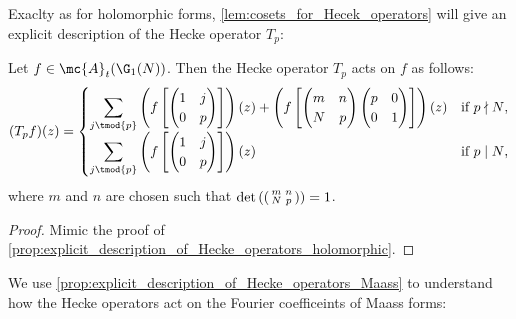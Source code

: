     Exaclty as for holomorphic forms, \cref{lem:cosets_for_Hecek_operators} will give an explicit description of the Hecke operator $T_{p}$:

    \begin{proposition}\label{prop:explicit_description_of_Hecke_operators_Maass}
      Let $f \in \mc{A}_{t}(\G_{1}(N))$. Then the Hecke operator $T_{p}$ acts on $f$ as follows:
      \[
        (T_{p}f)(z) = \begin{cases} \displaystyle{\sum_{j \tmod{p}}}\left(f\left[\begin{pmatrix} 1 & j \\ 0 & p \end{pmatrix}\right]\right)(z)+\left(f\left[\begin{pmatrix} m & n \\ N & p \end{pmatrix}\begin{pmatrix} p & 0 \\ 0 & 1 \end{pmatrix}\right]\right)(z) & \text{if $p \nmid N$}, \\ \displaystyle{\sum_{j \tmod{p}}}\left(f\left[\begin{pmatrix} 1 & j \\ 0 & p \end{pmatrix}\right]\right)(z) & \text{if $p \mid N$}, \end{cases}
      \]
      where $m$ and $n$ are chosen such that $\det\left(\begin{psmallmatrix} m & n \\ N & p \end{psmallmatrix}\right) = 1$.
    \end{proposition}
    \begin{proof}
      Mimic the proof of \cref{prop:explicit_description_of_Hecke_operators_holomorphic}.
    \end{proof}

    We use \cref{prop:explicit_description_of_Hecke_operators_Maass} to understand how the Hecke operators act on the Fourier coefficeints of Maass forms:


